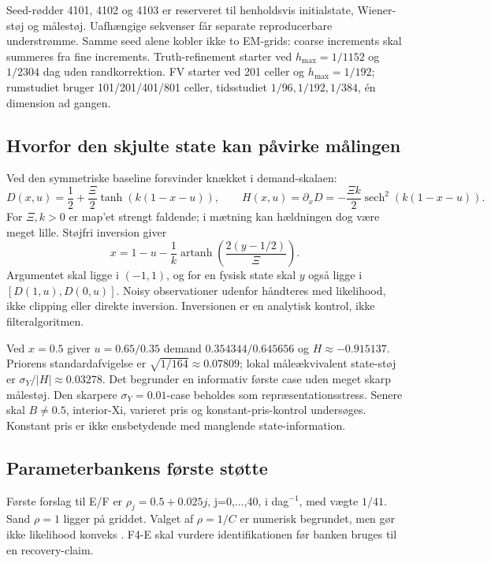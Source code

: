 Seed-rødder 4101, 4102 og 4103 er reserveret til henholdsvis initialstate, Wiener-støj
og målestøj. Uafhængige sekvenser får separate reproducerbare understrømme. Samme
seed alene kobler ikke to EM-grids: coarse increments skal summeres fra fine increments.
Truth-refinement starter ved \(h_{\max}=1/1152\) og \(1/2304\) dag uden randkorrektion.
FV starter ved 201 celler og \(h_{\max}=1/192\); rumstudiet bruger 101/201/401/801 celler,
tidsstudiet \(1/96,1/192,1/384\), én dimension ad gangen.

\subsection{Hvorfor den skjulte state kan påvirke målingen}
Ved den symmetriske baseline forsvinder knækket i demand-skalaen:
\begin{equation}
 D(x,u)=\frac12+\frac\Xi2\tanh(k(1-x-u)),\qquad
 H(x,u)=\partial_x D=-\frac{\Xi k}{2}\operatorname{sech}^2(k(1-x-u)).
 \label{eq:f4a_demand}
\end{equation}
For \(\Xi,k>0\) er map'et strengt faldende; i mætning kan hældningen dog være meget
lille. Støjfri inversion giver
\begin{equation}
 x=1-u-\frac1k\operatorname{artanh}\!\left(\frac{2(y-1/2)}\Xi\right).
 \label{eq:f4a_inverse}
\end{equation}
Argumentet skal ligge i \((-1,1)\), og for en fysisk state skal \(y\) også ligge i
\([D(1,u),D(0,u)]\). Noisy observationer udenfor håndteres med likelihood, ikke clipping
eller direkte inversion. Inversionen er en analytisk kontrol, ikke filteralgoritmen.

Ved \(x=0.5\) giver \(u=0.65/0.35\) demand \(0.354344/0.645656\) og
\(H\approx-0.915137\). Priorens standardafvigelse er \(\sqrt{1/164}\approx0.07809\);
lokal måleækvivalent state-støj er \(\sigma_Y/|H|\approx0.03278\).
Det begrunder en informativ første case uden meget skarp målestøj. Den skarpere
\(\sigma_Y=0.01\)-case beholdes som repræsentationsstress. Senere skal \(B\ne0.5\),
interior-Xi, varieret pris og konstant-pris-kontrol undersøges. Konstant pris er ikke
ensbetydende med manglende state-information.

\subsection{Parameterbankens første støtte}
Første forslag til E/F er \(\rho_j=0.5+0.025j\), j=0,...,40, i dag\(^{-1}\),
med vægte \(1/41\). Sand \(\rho=1\) ligger på griddet. Valget af \(\rho=1/C\)
er numerisk begrundet, men gør ikke likelihood konveks \cite{alba}.
F4-E skal vurdere identifikationen før banken bruges til en recovery-claim.

